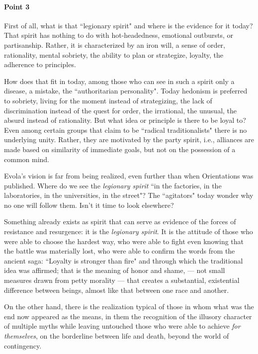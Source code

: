 \paragraph{Point 3}
\begin{quotex}
First of all, what is that ``legionary spirit" and where is the evidence for it today? That spirit has nothing to do with hot-headedness, emotional outbursts, or partisanship. Rather, it is characterized by an iron will, a sense of order, rationality, mental sobriety, the ability to plan or strategize, loyalty, the adherence to principles.

How does that fit in today, among those who can see in such a spirit only a disease, a mistake, the ``authoritarian personality". Today hedonism is preferred to sobriety, living for the moment instead of strategizing, the lack of discrimination instead of the quest for order, the irrational, the unusual, the absurd instead of rationality. But what idea or principle is there to be loyal to? Even among certain groups that claim to be ``radical traditionalists" there is no underlying unity. Rather, they are motivated by the party spirit, i.e., alliances are made based on similarity of immediate goals, but not on the possession of a common mind.

Evola's vision is far from being realized, even further than when Orientations was published. Where do we see the \emph{legionary spirit} ``in the factories, in the laboratories, in the universities, in the street"? The ``agitators" today wonder why no one will follow them. Isn't it time to look elsewhere? 

\end{quotex}
Something already exists as spirit that can serve as evidence of the forces of resistance and resurgence: it is the \emph{legionary spirit}. It is the attitude of those who were able to choose the hardest way, who were able to fight even knowing that the battle was materially lost, who were able to confirm the words from the ancient saga: ``Loyalty is stronger than fire" and through which the traditional idea was affirmed; that is the meaning of honor and shame, — not small measures drawn from petty morality — that creates a substantial, existential difference between beings, almost like that between one race and another.

On the other hand, there is the realization typical of those in whom what was the end now appeared as the means, in them the recognition of the illusory character of multiple myths while leaving untouched those who were able to achieve \emph{for themselves}, on the borderline between life and death, beyond the world of contingency.

